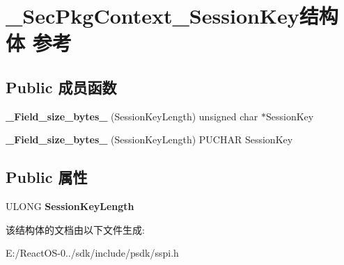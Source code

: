 \hypertarget{struct___sec_pkg_context___session_key}{}\section{\+\_\+\+Sec\+Pkg\+Context\+\_\+\+Session\+Key结构体 参考}
\label{struct___sec_pkg_context___session_key}
\subsection*{Public 成员函数}
\begin{DoxyCompactItemize}
\item 
\mbox{\label{struct___sec_pkg_context___session_key_acc5dba62495bfe550e597c8d78d1eea8}} 
{\bfseries \+\_\+\+Field\+\_\+size\+\_\+bytes\+\_\+} (Session\+Key\+Length) unsigned char $\ast$Session\+Key
\item 
\mbox{\label{struct___sec_pkg_context___session_key_a59d1b1da485dadb522bc533183aee52e}} 
{\bfseries \+\_\+\+Field\+\_\+size\+\_\+bytes\+\_\+} (Session\+Key\+Length) P\+U\+C\+H\+AR Session\+Key
\end{DoxyCompactItemize}
\subsection*{Public 属性}
\begin{DoxyCompactItemize}
\item 
\mbox{\label{struct___sec_pkg_context___session_key_a13d1e53a82bbb733d76d85be340d4681}} 
U\+L\+O\+NG {\bfseries Session\+Key\+Length}
\end{DoxyCompactItemize}


该结构体的文档由以下文件生成\+:\begin{DoxyCompactItemize}
\item 
E\+:/\+React\+O\+S-\/0../sdk/include/psdk/sspi.\+h\end{DoxyCompactItemize}
